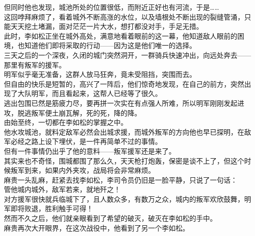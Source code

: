 \begin{multicols}{\theparacolNo}
但同时他也发现，城池所处的位置很低，而附近正好也有河流，于是……\\

这回哱拜麻烦了，看着城外不断高涨的水位，以及墙根处不断出现的裂缝管涌，只能天天挖土堵漏，面对茫茫一片大水，想打都没对手，手足无措。\\

此时，李如松正坐在城外高处，满意地看着眼前的这一幕，他知道敌人眼前的困境，也知道他们即将采取的行动——因为这是他们唯一的选择。\\

三天之后的一个深夜，久闭的城门突然洞开，一群骑兵快速冲出，向远处奔去——那里有叛军的援军。\\

明军似乎毫无准备，这群人放马狂奔，竟未受阻挡，突围而去。\\

但自由的快乐是短暂的，高兴了一阵后，他们惊奇地发现，在自己的前方，突然出现了大队明军，而且看起来，这帮人已经等了很久。\\

逃出包围已然是筋疲力尽，要再拼一次实在有点强人所难，所以明军刚刚发起进攻，脱逃叛军便土崩瓦解，死的死，降的降。\\

由始至终，一切都在李如松的掌握之中。\\

他水攻城池，就料定敌军必然会出城求援，而城外叛军的方向他也早已探明，在敌军必经之路上设下埋伏，是一件再简单不过的事情。\\

但有一件事情仍出乎了他的意料——叛军援军还是来了。\\

其实来也不奇怪，围城都围了那么久，天天枪打炮轰，保密是谈不上了，但这个时候叛军到来，如果内外夹攻，战局将会非常麻烦。\\

麻贵一头乱麻，赶紧去找李如松，李司令员仍旧是一脸平静，只说了一句话：\\

管他城内城外，敌军若来，就地歼之！\\

对方援军很快就兵临城下了，且人数众多，有数万之众，城内的叛军欢欣鼓舞，明军即将败退，胜利触手可得！\\

然而不久之后，他们就亲眼看到了希望的破灭，破灭在李如松的手中。\\

麻贵再次大开眼界，在这次战役中，他看到了另一个李如松。\\


\end{multicols}
